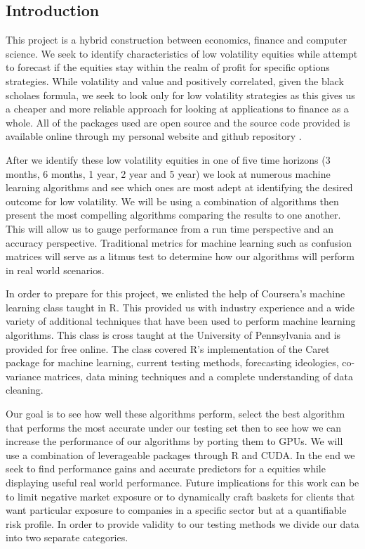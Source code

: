 \documentclass[paper=letter, fontsize=11pt]{scrartcl}
\numberwithin{equation}{section}		%
\numberwithin{figure}{section}			%
\numberwithin{table}{section}				%
\begin{document}
\begin{spacing}{2}
\section{Introduction}
This project is a hybrid construction between economics, finance and computer science. We seek to identify characteristics of low volatility equities while attempt to forecast if the equities stay within the realm of profit for specific options strategies. While volatility and value and positively correlated, given the black scholaes formula, we seek to look only for low volatility strategies as this gives us a cheaper and more reliable approach for looking at applications to finance as a whole. All of the packages used are open source and the source code provided is available online through my personal website and github repository\cite{gilyard_website} \cite{github_repo}. 

After we identify these low volatility equities in one of five time horizons (3 months, 6 months, 1 year, 2 year and 5 year) we look at numerous machine learning algorithms and see which ones are most adept at identifying the desired outcome for low volatility. We will be using a combination of algorithms then present the most compelling algorithms comparing the results to one another. This will allow us to gauge performance from a run time perspective and an accuracy perspective. Traditional metrics for machine learning such as confusion matrices will serve as a litmus test to determine how our algorithms will perform in real world scenarios. 

In order to prepare for this project, we enlisted the help of Coursera's machine learning class taught in R. This provided us with industry experience and a wide variety of additional techniques that have been used to perform machine learning algorithms. This class is cross taught at the University of Pennsylvania and is provided for free online. The class covered R's implementation of the Caret package for machine learning, current testing methods, forecasting ideologies, co-variance matrices, data mining techniques and a complete understanding of data cleaning. 

Our goal is to see how well these algorithms perform, select the best algorithm that performs the most accurate under our testing set then to see how we can increase the performance of our algorithms by porting them to GPUs. We will use a combination of leverageable packages through R and CUDA. In the end we seek to find performance gains and accurate predictors for a equities while displaying useful real world performance. Future implications for this work can be to limit negative market exposure or to dynamically craft baskets for clients that want particular exposure to companies in a specific sector but at a quantifiable risk profile. In order to provide validity to our testing methods we divide our data into two separate categories. 

\end{spacing}
\end{document}
